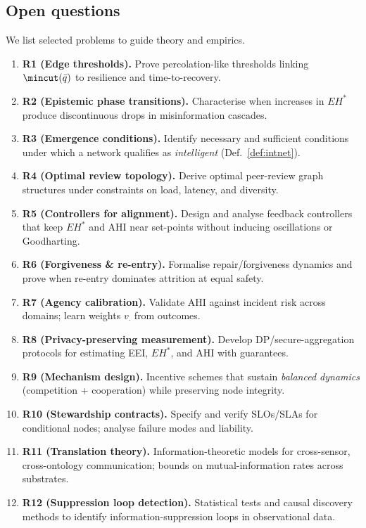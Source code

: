 \documentclass[12pt]{article}
\begin{document}
\subsection{Open questions}
We list selected problems to guide theory and empirics.
\begin{enumerate}[leftmargin=1.2em]
\item \textbf{R1 (Edge thresholds).} Prove percolation-like thresholds linking $\mincut(\bar{q})$ to resilience and time-to-recovery.
\item \textbf{R2 (Epistemic phase transitions).} Characterise when increases in $EH^{\ast}$ produce discontinuous drops in misinformation cascades.
\item \textbf{R3 (Emergence conditions).} Identify necessary and sufficient conditions under which a network qualifies as \emph{intelligent} (Def.~\ref{def:intnet}).
\item \textbf{R4 (Optimal review topology).} Derive optimal peer-review graph structures under constraints on load, latency, and diversity.
\item \textbf{R5 (Controllers for alignment).} Design and analyse feedback controllers that keep $EH^{\ast}$ and AHI near set-points without inducing oscillations or Goodharting.
\item \textbf{R6 (Forgiveness \& re-entry).} Formalise repair/forgiveness dynamics and prove when re-entry dominates attrition at equal safety.
\item \textbf{R7 (Agency calibration).} Validate AHI against incident risk across domains; learn weights $v_{\cdot}$ from outcomes.
\item \textbf{R8 (Privacy-preserving measurement).} Develop DP/secure-aggregation protocols for estimating EEI, $EH^{\ast}$, and AHI with guarantees.
\item \textbf{R9 (Mechanism design).} Incentive schemes that sustain \emph{balanced dynamics} (competition + cooperation) while preserving node integrity.
\item \textbf{R10 (Stewardship contracts).} Specify and verify SLOs/SLAs for conditional nodes; analyse failure modes and liability.
\item \textbf{R11 (Translation theory).} Information-theoretic models for cross-sensor, cross-ontology communication; bounds on mutual-information rates across substrates.
\item \textbf{R12 (Suppression loop detection).} Statistical tests and causal discovery methods to identify information-suppression loops in observational data.

\end{enumerate}
\end{document}
